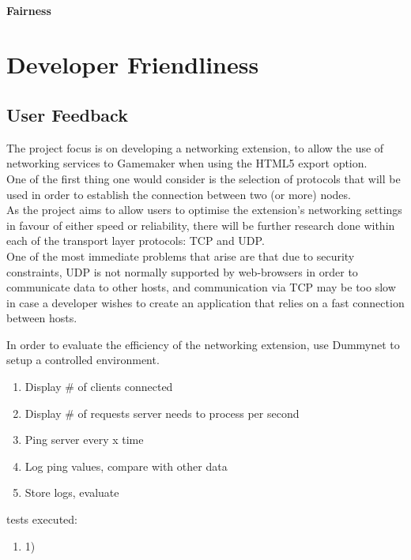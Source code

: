 \documentclass[12pt]{article}
\begin{document}
\paragraph{Fairness}
\section{Developer Friendliness}
\subsection{User Feedback}

The project focus is on developing a networking extension, to allow the use of networking services to Gamemaker when using the HTML5 export option.\\
One of the first thing one would consider is the selection of protocols that will be used in order to establish the connection between two (or more) nodes.\\
As the project aims to allow users to optimise the extension's networking settings in favour of either speed or reliability, there will be further research done within each of the transport layer protocols: TCP and UDP.\\
One of the most immediate problems that arise are that due to security constraints, UDP is not normally supported by web-browsers in order to communicate data to other hosts, and communication via TCP may be too slow in case a developer wishes to create an application that relies on a fast connection between hosts.

In order to evaluate the efficiency of the networking extension, use Dummynet to setup a controlled environment.

\begin{enumerate}
\item Display \# of clients connected
\item Display \# of requests server needs to process per second
\item Ping server every x time
\item Log ping values, compare with other data
\item Store logs, evaluate
\end{enumerate}

tests executed:
\begin{enumerate}
\item 1) 
\end{enumerate}
\end{document}
